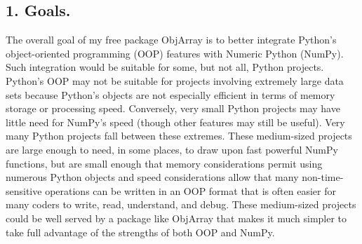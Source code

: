 \documentclass[letterpaper,compsoc,twoside]{IEEEtran}
\begin{document}
\subsection{1.  Goals.%
  \label{goals}%
}


The overall goal of my free package ObjArray is to better integrate Python's object-oriented programming (OOP) features with Numeric Python (NumPy).  Such integration would be suitable for some, but not all, Python projects.  Python's OOP may not be suitable for projects involving extremely large data sets because Python's objects are not especially efficient in terms of memory storage or processing speed.  Conversely, very small Python projects may have little need for NumPy's speed (though other features may still be useful).  Very many Python projects fall between these extremes.  These \textquotedbl{}medium-sized\textquotedbl{} projects are large enough to need, in some places, to draw upon fast powerful NumPy functions, but are small enough that memory considerations permit using numerous Python objects and speed considerations allow that many non-time-sensitive operations can be written in an OOP format that is often easier for many coders to write, read, understand, and debug.  These medium-sized projects could be well served by a package like ObjArray that makes it much simpler to take full advantage of the strengths of both OOP and NumPy.
\end{document}
